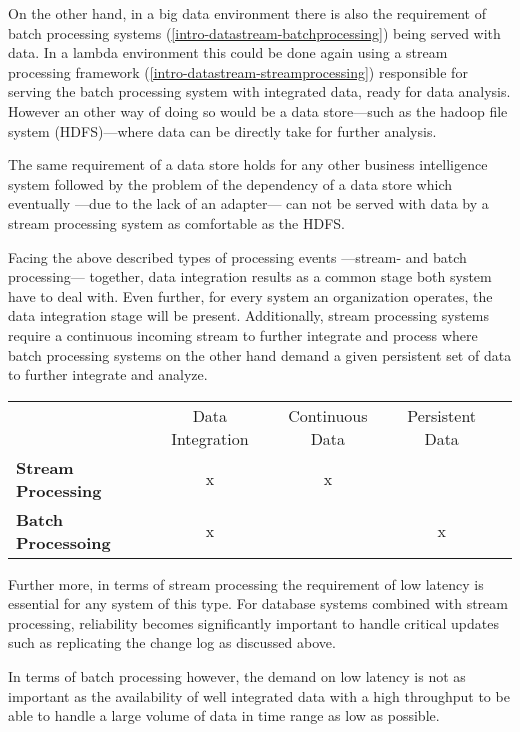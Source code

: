 On the other hand, in a big data environment there is also the requirement of
batch processing systems (\ref{intro-datastream-batchprocessing}) being served
with data. In a lambda environment this could be done again using a stream
processing framework (\ref{intro-datastream-streamprocessing}) responsible for
serving the batch processing system with integrated data, ready for data
analysis. However an other way of doing so would be a data store---such as the
hadoop file system (HDFS)---where data can be directly take for further analysis.

The same requirement of a data store holds for any other business intelligence
system followed by the problem of the dependency of a data store which
eventually ---due to the lack of an adapter--- can not be served with data by a
stream processing system as comfortable as the HDFS.

Facing the above described types of processing events ---stream- and batch
processing--- together, data integration results as a common stage both system have to
deal with. Even further, for every system an organization operates, the data
integration stage will be present. 
Additionally, stream processing systems require a continuous
incoming stream to further integrate and process where batch processing systems
on the other hand demand a given persistent set of data to further integrate and analyze.

\begin{table}[h]
\begin{tabular}{l|c|c|cl}
\multicolumn{1}{c|}{\textbf{}} & Data Integration & Continuous Data & Persistent
Data & \multicolumn{1}{c}{} \\ \cline{1-4}
\textbf{Stream Processing}     & x                & x               &
&                      \\
\textbf{Batch Processoing}     & x                &                 & x
&
\end{tabular}
\end{table}

Further more, in terms of stream processing the requirement of low latency is
essential for any system of this type. For database systems combined with stream
processing, reliability becomes significantly important to handle critical updates 
such as replicating the change log as discussed above.

In terms of batch processing however, the demand on low latency is not as
important as the availability of well integrated data with a high throughput to
be able to handle a large volume of data in time range as low as possible.

